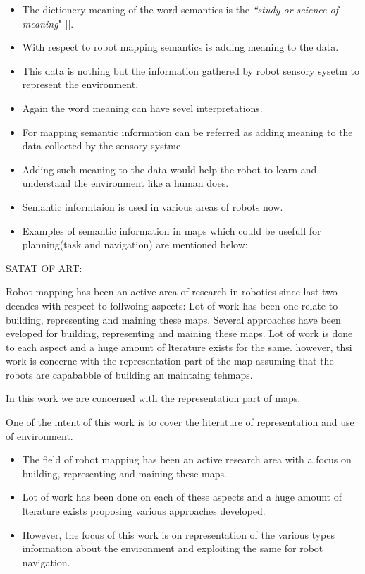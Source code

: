 \begin{itemize}[noitemsep,nolistsep]
 \item The dictionery meaning of the word semantics is the \textit{``study or science of meaning}" [].
 \item With respect to robot mapping semantics is adding meaning to the data.
 \item This data is nothing but the information gathered by robot sensory sysetm to represent the environment.
 \item Again the word meaning can have sevel interpretations.
 \item For mapping semantic information can be referred as adding meaning to the data collected by the sensory systme 
 \item Adding such meaning to the data would help the robot to learn and understand the environment like a human does.
 \item Semantic informtaion is used in various areas of robots now.
 \item Examples of semantic information in maps which could be usefull for planning(task and navigation) are mentioned below:
 


 
\end{itemize}









SATAT OF ART:

Robot mapping has been an active area of research in robotics since last two decades with respect to follwoing aspects:
Lot of work has been one relate to  building, representing and maining these maps.
Several approaches have been eveloped for building, representing and maining these maps.
Lot of work is done to each aspect  and a huge amount of lterature exists for the same.
however, thsi work is concerne with the representation part of the map assuming that the robots are capababble of building an maintaing tehmaps.
 
In this work we are concerned with the representation part of maps.



One of the intent of this work is to cover the literature of representation  and use of environment.


\begin{itemize}
 \item The field of robot mapping has been an active research area with a focus on building, representing and maining these maps.
 \item Lot of work has been done on each of these aspects and a huge amount of lterature exists proposing various approaches developed. 
 \item However, the focus of this work is on representation of the various types information about the environment and exploiting the same for robot navigation.
\end{itemize}

